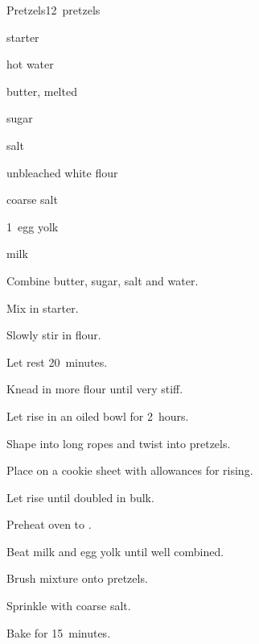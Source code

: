 \begin{recipe}{Pretzels}{}{12~pretzels}

\begin{ingredients}
\item {} starter
\item {} hot water
\item {} butter, melted
\item {} sugar
\item {} salt
\item {} unbleached white flour
\item coarse salt
\item 1~egg yolk
\item {} milk
\end{ingredients}

\begin{directions}
\item Combine butter, sugar, salt and water.
\item Mix in starter.
\item Slowly stir in flour.
\item Let rest 20~minutes.
\item Knead in more flour until very stiff.
\item Let rise in an oiled bowl for 2~hours.
\item Shape into long ropes and twist into pretzels.
\item Place on a cookie sheet with allowances for rising.
\item Let rise until doubled in bulk.
\item Preheat oven to .
\item Beat milk and egg yolk until well combined.
\item Brush mixture onto pretzels.
\item Sprinkle with coarse salt.
\item Bake for 15~minutes.
\end{directions}
\end{recipe}
